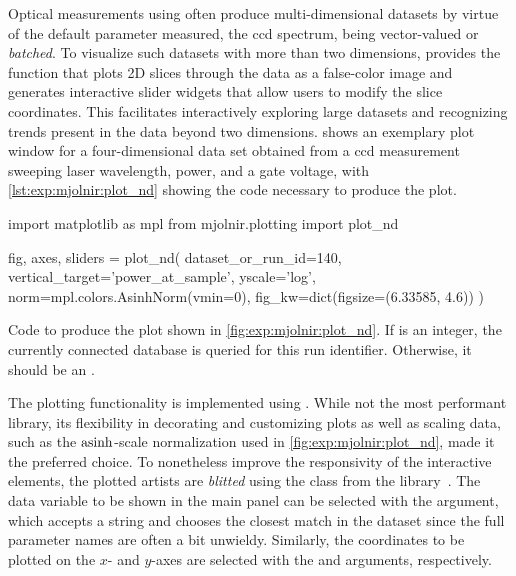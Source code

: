 Optical measurements using \mjolnir often produce multi-dimensional datasets by virtue of the default parameter measured, the \gls{ccd} spectrum, being vector-valued or \emph{batched}.
To visualize such datasets with more than two dimensions, \mjolnir provides the  function that plots 2D slices through the data as a false-color image and generates interactive slider widgets that allow users to modify the slice coordinates.
This facilitates interactively exploring large datasets and recognizing trends present in the data beyond two dimensions.
 shows an exemplary plot window for a four-dimensional data set obtained from a \gls{ccd} measurement sweeping laser wavelength, power, and a gate voltage, with \cref{lst:exp:mjolnir:plot_nd} showing the code necessary to produce the plot.

\begin{listing}[htpb]
    \begin{pycode}
        import matplotlib as mpl
        from mjolnir.plotting import plot_nd

        fig, axes, sliders = plot_nd(
            dataset_or_run_id=140, vertical_target='power_at_sample',
            yscale='log', norm=mpl.colors.AsinhNorm(vmin=0),
            fig_kw=dict(figsize=(6.33585, 4.6))
        )
    \end{pycode}
    \caption[\texttt{plot_nd()} example]{
        Code to produce the plot shown in \cref{fig:exp:mjolnir:plot_nd}.
        If  is an integer, the currently connected \qcodes database is queried for this run identifier.
        Otherwise, it should be an \xarray {}.
    }
    \label{lst:exp:mjolnir:plot_nd}
\end{listing}

The plotting functionality is implemented using \matplotlib.
While not the most performant library, its flexibility in decorating and customizing plots as well as scaling data, such as the $\operatorname{asinh}$-scale normalization used in \cref{fig:exp:mjolnir:plot_nd}, made it the preferred choice.
To nonetheless improve the responsivity of the interactive elements, the plotted artists are \emph{blitted}
using the  class from the \qutil library~\cite{Hangleiter_qutil}.
The data variable to be shown in the main panel can be selected with the  argument, which accepts a string and chooses the closest match in the dataset since the full parameter names are often a bit unwieldy.
Similarly, the coordinates to be plotted on the $x$- and $y$-axes are selected with the  and  arguments, respectively.

